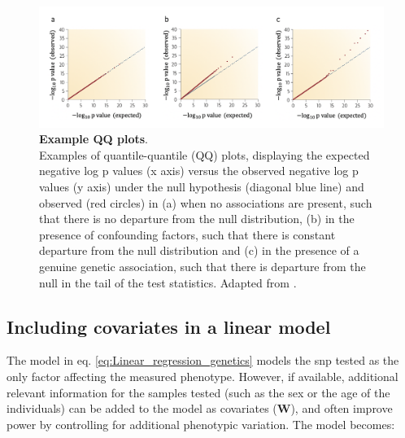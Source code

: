 
\begin{figure}[h]
\centering
\includegraphics[width=15cm]{Chapter2/Fig/qqplots.png}
\caption[QQ plots]{\textbf{Example QQ plots}.\\
Examples of quantile-quantile (QQ) plots, displaying the expected negative log p values (x axis) versus the observed negative log p values (y axis) under the null hypothesis (diagonal blue line) and observed (red circles) in (a) when no associations are present, such that there is no departure from the null distribution,  (b) in the presence of confounding factors, such that there is constant departure from the null distribution and (c) in the presence of a genuine genetic association, such that there is departure from the null in the tail of the test statistics.
Adapted from 
\cite{mccarthy2008genome}.
}
\label{fig:qqplots}
\end{figure}



\subsection{Including covariates in a linear model}
\label{sec:confounders}

The model in eq. \eqref{eq:Linear_regression_genetics} models the \gls{snp} tested as the only factor affecting the measured phenotype.
However, if available, additional relevant information for the samples tested (such as the sex or the age of the individuals) can be added to the model as covariates ($\mathbf{W}$), and often improve power by controlling for additional phenotypic variation. 
The model becomes:

